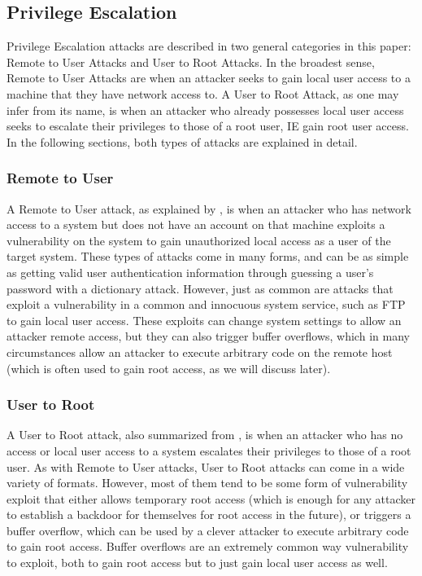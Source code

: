 \documentclass{acm_proc_article-sp}
\begin{document}
		
    
    \subsection{Privilege Escalation} %
    	Privilege Escalation attacks are described in two general categories in this paper: Remote to User Attacks and User to Root Attacks. In the broadest sense, Remote to User Attacks are when an attacker seeks to gain local user access to a machine that they have network access to. A User to Root Attack, as one may infer from its name, is when an attacker who already possesses local user access seeks to escalate their privileges to those of a root user, IE gain root user access. In the following sections, both types of attacks are explained in detail.
    \subsubsection{Remote to User}
    	A Remote to User attack, as explained by \cite{Labs1999}, is when an attacker who has network access to a system but does not have an account on that machine exploits a vulnerability on the system to gain unauthorized local access as a user of the target system. These types of attacks come in many forms, and can be as simple as getting valid user authentication information through guessing a user's password with a dictionary attack. However, just as common are attacks that exploit a vulnerability in a common and innocuous system service, such as FTP to gain local user access. These exploits can change system settings to allow an attacker remote access, but they can also trigger buffer overflows, which in many circumstances allow an attacker to execute arbitrary code on the remote host (which is often used to gain root access, as we will discuss later). 
    \subsubsection{User to Root}
     	A User to Root attack, also summarized from \cite{Labs1999}, is when an attacker who has no access or local user access to a system escalates their privileges to those of a root user. As with Remote to User attacks, User to Root attacks can come in a wide variety of formats. However, most of them tend to be some form of vulnerability exploit that either allows temporary root access (which is enough for any attacker to establish a backdoor for themselves for root access in the future), or triggers a buffer overflow, which can be used by a clever attacker to execute arbitrary code to gain root access. Buffer overflows are an extremely common way vulnerability to exploit, both to gain root access but to just gain local user access as well.
\end{document}
